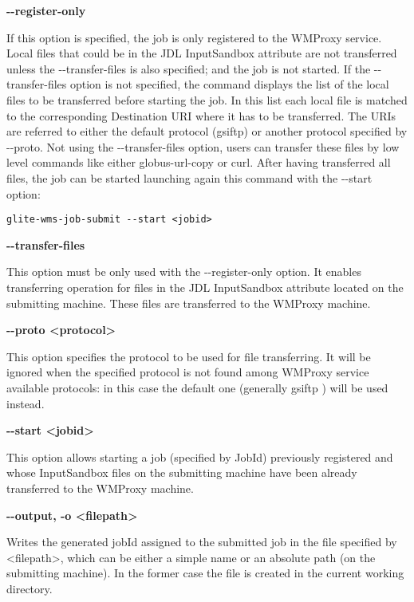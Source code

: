 \textbf{-{}-register-only}

If this option is specified, the job is only registered to the WMProxy service. Local files that could be in the JDL InputSandbox attribute are not transferred unless the -{}-transfer-files is also specified; and the job is not started. If the -{}-transfer-files option is not specified, the command displays the list of the local files to be transferred before starting the job. In this list each local file is matched to the corresponding Destination URI where it has to be transferred. The URIs are referred to either the default protocol (gsiftp) or another protocol specified by -{}-proto.  Not using the -{}-transfer-files option, users can transfer these files by low level commands like either globus-url-copy or curl. After having transferred all files, the job can be started launching again this command with the -{}-start option:
\begin{verbatim}
glite-wms-job-submit --start <jobid>
\end{verbatim}




\textbf{-{}-transfer-files}

This option must be only used with the -{}-register-only option. It enables transferring operation for files in the JDL InputSandbox attribute located on the submitting machine. These files are transferred to the WMProxy machine.




\textbf{-{}-proto <protocol>}

This option specifies the protocol to be used for file transferring. It will be ignored when the specified protocol is not found among WMProxy service available protocols: in this case the default one (generally gsiftp ) will be used instead.




\textbf{-{}-start <jobid>}

This option allows starting a job (specified by JobId) previously registered and whose InputSandbox files on the submitting machine have been already transferred to the WMProxy machine.




\textbf{-{}-output, -o <filepath>}

Writes the generated jobId assigned to the submitted job in the file specified by <filepath>, which can be either a simple name or an absolute path (on the submitting machine). In the former case the file is created in the current working directory.




